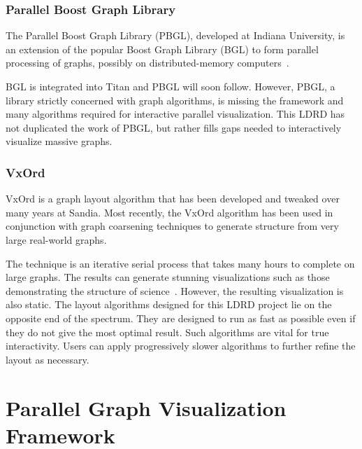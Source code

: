 \documentclass[pdf,12pt,report,strict]{SANDreport}
\newcommand*{\lcite}[1]{~\cite{#1}}
\newcommand{\titan}{Titan\xspace}
\begin{document}

\subsection{Parallel Boost Graph Library}
\label{sec:RelatedProjects:PBGL}


The Parallel Boost Graph Library (PBGL), developed at Indiana University,
is an extension of the popular Boost Graph Library (BGL) to form parallel
processing of graphs, possibly on distributed-memory
computers\lcite{Gregor05}.

BGL is integrated into \titan and PBGL will soon follow.  However, PBGL, a
library strictly concerned with graph algorithms, is missing the framework
and many algorithms required for interactive parallel visualization.  This
LDRD has not duplicated the work of PBGL, but rather fills gaps needed to
interactively visualize massive graphs.


\subsection{VxOrd}
\label{sec:RelatedProjects:VxOrd}


VxOrd is a graph layout algorithm that has been developed and tweaked over
many years at Sandia.  Most recently, the VxOrd algorithm has been used in
conjunction with graph coarsening techniques to generate structure from
very large real-world graphs.

The technique is an iterative serial process that takes many hours to
complete on large graphs.  The results can generate stunning visualizations
such as those demonstrating the structure of
science\lcite{Boyack04,Boyack05}.  However, the resulting visualization is
also static.  The layout algorithms designed for this LDRD project lie on
the opposite end of the spectrum.  They are designed to run as fast as
possible even if they do not give the most optimal result.  Such algorithms
are vital for true interactivity.  Users can apply progressively slower
algorithms to further refine the layout as necessary.



\chapter{Parallel Graph Visualization Framework}
\label{chap:ParallelGraphVisualizationFramework}
\end{document}
